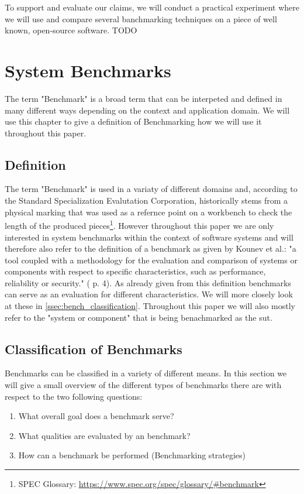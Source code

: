 \documentclass[	runningheads,
				a4paper]{llncs}
\begin{document}
To support and evaluate our claims, we will conduct a practical experiment where we will use and compare several banchmarking techniques on a piece of well known, open-source software.
TODO

\section{System Benchmarks}
\label{sec:benchmarking}
The term "Benchmark" is a broad term that can be interpeted and defined in many different ways depending on the context and application domain. We will use this chapter to give a definition of Benchmarking how we will use it throughout this paper.

\subsection{Definition}
\label{ssec:bench_definition}
The term "Benchmark" is used in a variaty of different domains and, according to the Standard Specialization Evalutation Corporation, historically stems from a physical marking that was used as a refernce point on a workbench to check the length of the produced pieces\footnote{SPEC Glossary: \url{https://www.spec.org/spec/glossary/\#benchmark}}. However throughout this paper we are only interested in system benchmarks within the context of software systems and will therefore also refer to the definition of a benchmark as given by Kounev et al.: "a tool coupled with a methodology for the evaluation and comparison of systems or components with respect to specific characteristics, such as performance, reliability or security." (\cite{Kounev} p. 4). As already given from this definition benchmarks can serve as an evaluation for different characteristics. We will more closely look at these in \autoref{ssec:bench_classification}. Throughout this paper we will also mostly refer to the "system or component" that is being benachmarked as the \gls{sut}.

\subsection{Classification of Benchmarks}
\label{ssec:bench_classification}
Benchmarks can be classified in a variety of different means. In this section we will give a small overview of the different types of benchmarks there are with respect to the two following questions:
\begin{enumerate}
	\item What overall goal does a benchmark serve?
	\item What qualities are evaluated by an benchmark?
	\item How can a benchmark be performed (Benchmarking strategies)
\end{enumerate}
\end{document}
